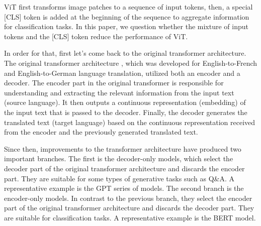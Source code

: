 \documentclass[anon,12pt]{colt2024} %
\begin{document}
ViT first transforms image patches to a sequence of input tokens, then, a special [CLS] token is added at the beginning of the sequence to aggregate information for classification tasks.
In this paper, we question whether the mixture of input tokens and the [CLS] token reduce the performance of ViT.


In order for that, first let's come back to the original transformer architecture. 
The original transformer architecture \cite{vaswani2017attention}, which was developed for English-to-French and English-to-German language translation, utilized both an encoder and a decoder.
The encoder part in the original transformer is responsible for understanding and extracting the relevant information from the input text (source language). It then outputs a continuous representation (embedding) of the input text that is passed to the decoder. Finally, the decoder generates the translated text (target language) based on the continuous representation received from the encoder and the previously generated translated text. 

Since then, improvements to the transformer architecture have produced two important branches. 
The first is the decoder-only models, which select the decoder part of the original transformer architecture and discards the encoder part. 
They are suitable for some types of generative tasks such as Q\&A.
A representative example is the GPT \cite{radford2018improving, brown2020language,ouyang2022training} series of models.
The second branch is the encoder-only models. In contrast to the previous branch, they select the encoder part of the original transformer architecture and discards the decoder part.
They are suitable for classification tasks. A representative example is the BERT \cite{devlin2018bert} model. 
\end{document}
